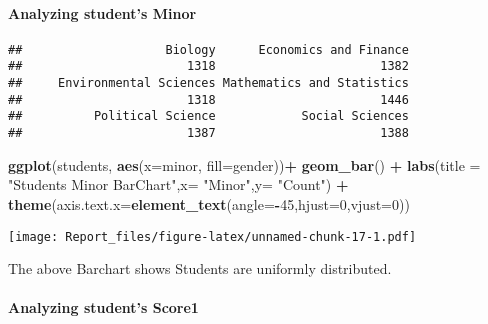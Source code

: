 \documentclass[
]{article}
\newenvironment{Shaded}{\begin{snugshade}}{\end{snugshade}}
\newcommand{\DataTypeTok}[1]{\textcolor[rgb]{0.13,0.29,0.53}{#1}}
\newcommand{\DecValTok}[1]{\textcolor[rgb]{0.00,0.00,0.81}{#1}}
\newcommand{\KeywordTok}[1]{\textcolor[rgb]{0.13,0.29,0.53}{\textbf{#1}}}
\newcommand{\NormalTok}[1]{#1}
\newcommand{\OperatorTok}[1]{\textcolor[rgb]{0.81,0.36,0.00}{\textbf{#1}}}
\newcommand{\StringTok}[1]{\textcolor[rgb]{0.31,0.60,0.02}{#1}}
\begin{document}
\hypertarget{analyzing-students-minor}{%
\paragraph{Analyzing student's Minor}\label{analyzing-students-minor}}

\begin{Shaded}
\end{Shaded}

\begin{verbatim}
##                    Biology      Economics and Finance 
##                       1318                       1382 
##     Environmental Sciences Mathematics and Statistics 
##                       1318                       1446 
##          Political Science            Social Sciences 
##                       1387                       1388
\end{verbatim}

\begin{Shaded}
\begin{Highlighting}[]
\KeywordTok{ggplot}\NormalTok{(students, }\KeywordTok{aes}\NormalTok{(}\DataTypeTok{x=}\NormalTok{minor, }\DataTypeTok{fill=}\NormalTok{gender))}\OperatorTok{+}
\StringTok{  }\KeywordTok{geom_bar}\NormalTok{() }\OperatorTok{+}\StringTok{ }
\StringTok{  }\KeywordTok{labs}\NormalTok{(}\DataTypeTok{title =} \StringTok{"Students Minor BarChart"}\NormalTok{,}\DataTypeTok{x=} \StringTok{"Minor"}\NormalTok{,}\DataTypeTok{y=} \StringTok{"Count"}\NormalTok{) }\OperatorTok{+}
\StringTok{  }\KeywordTok{theme}\NormalTok{(}\DataTypeTok{axis.text.x=}\KeywordTok{element_text}\NormalTok{(}\DataTypeTok{angle=}\OperatorTok{-}\DecValTok{45}\NormalTok{,}\DataTypeTok{hjust=}\DecValTok{0}\NormalTok{,}\DataTypeTok{vjust=}\DecValTok{0}\NormalTok{))}
\end{Highlighting}
\end{Shaded}

\texttt{[image: Report\_files/figure-latex/unnamed-chunk-17-1.pdf]}

The above Barchart shows Students are uniformly distributed.

\hypertarget{analyzing-students-score1}{%
\paragraph{Analyzing student's Score1}\label{analyzing-students-score1}}
\end{document}
